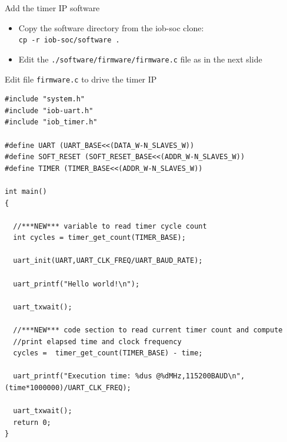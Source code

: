 \documentclass [xcolor=svgnames, t] {beamer}
\begin{document}
\begin{frame}{Add the timer IP software}
\begin{itemize}
\item Copy the software directory from the iob-soc clone:
  \\{\tt cp -r iob-soc/software .}
\item Edit the {\tt ./software/firmware/firmware.c} file as in the next slide\\
\end{itemize}
\end{frame}

\begin{frame}[fragile]{Edit file {\tt firmware.c} to drive the timer IP}
\begin{tiny}
\begin{lstlisting}
#include "system.h"
#include "iob-uart.h"
#include "iob_timer.h"

#define UART (UART_BASE<<(DATA_W-N_SLAVES_W))
#define SOFT_RESET (SOFT_RESET_BASE<<(ADDR_W-N_SLAVES_W))
#define TIMER (TIMER_BASE<<(ADDR_W-N_SLAVES_W))

int main()
{ 

  //***NEW*** variable to read timer cycle count
  int cycles = timer_get_count(TIMER_BASE);
  
  uart_init(UART,UART_CLK_FREQ/UART_BAUD_RATE);   

  uart_printf("Hello world!\n");

  uart_txwait();
  
  //***NEW*** code section to read current timer count and compute 
  //print elapsed time and clock frequency
  cycles =  timer_get_count(TIMER_BASE) - time;

  uart_printf("Execution time: %dus @%dMHz,115200BAUD\n",(time*1000000)/UART_CLK_FREQ);

  uart_txwait();
  return 0;
}
\end{lstlisting}
\end{tiny}
\end{frame}
\end{document}

